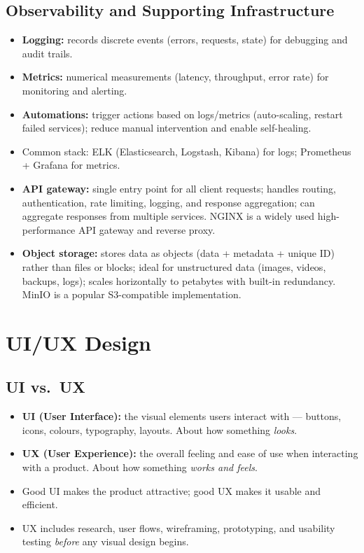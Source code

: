 \documentclass[hidelinks]{article}
\begin{document}
\subsection{Observability and Supporting Infrastructure}
\begin{itemize}
  \item \textbf{Logging:} records discrete events (errors, requests, state) for debugging and audit trails.
  \item \textbf{Metrics:} numerical measurements (latency, throughput, error rate) for monitoring and
        alerting.
  \item \textbf{Automations:} trigger actions based on logs/metrics (auto-scaling, restart failed
        services); reduce manual intervention and enable self-healing.
  \item Common stack: ELK (Elasticsearch, Logstash, Kibana) for logs; Prometheus + Grafana for metrics.
  \item \textbf{API gateway:} single entry point for all client requests; handles routing, authentication,
        rate limiting, logging, and response aggregation; can aggregate responses from multiple services.
        NGINX is a widely used high-performance API gateway and reverse proxy.
  \item \textbf{Object storage:} stores data as objects (data + metadata + unique ID) rather than files or
        blocks; ideal for unstructured data (images, videos, backups, logs); scales horizontally to
        petabytes with built-in redundancy. MinIO is a popular S3-compatible implementation.
\end{itemize}

\section{UI/UX Design}

\subsection{UI vs.\ UX}
\begin{itemize}
  \item \textbf{UI (User Interface):} the visual elements users interact with --- buttons, icons, colours,
        typography, layouts. About how something \emph{looks}.
  \item \textbf{UX (User Experience):} the overall feeling and ease of use when interacting with a product.
        About how something \emph{works and feels}.
  \item Good UI makes the product attractive; good UX makes it usable and efficient.
  \item UX includes research, user flows, wireframing, prototyping, and usability testing
        \emph{before} any visual design begins.
\end{itemize}
\end{document}
